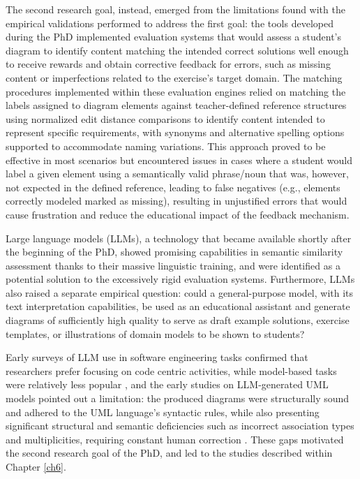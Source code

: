 The second research goal, instead, emerged from the limitations found with the empirical validations performed to address the first goal: the tools developed during the PhD implemented evaluation systems that would assess a student's diagram to identify content matching the intended correct solutions well enough to receive rewards and obtain corrective feedback for errors, such as missing content or imperfections related to the exercise's target domain. The matching procedures implemented within these evaluation engines relied on matching the labels assigned to diagram elements against teacher-defined reference structures using normalized edit distance comparisons to identify content intended to represent specific requirements, with synonyms and alternative spelling options supported to accommodate naming variations. This approach proved to be effective in most scenarios but encountered issues in cases where a student would label a given element using a semantically valid phrase/noun that was, however, not expected in the defined reference, leading to false negatives (e.g., elements correctly modeled marked as missing), resulting in unjustified errors that would cause frustration and reduce the educational impact of the feedback mechanism. 

Large language models (LLMs), a technology that became available shortly after the beginning of the PhD, showed promising capabilities in semantic similarity assessment thanks to their massive linguistic training, and were identified as a potential solution to the excessively rigid evaluation systems. Furthermore, LLMs also raised a separate empirical question: could a general-purpose model, with its text interpretation capabilities, be used as an educational assistant and generate diagrams of sufficiently high quality to serve as draft example solutions, exercise templates, or illustrations of domain models to be shown to students?

Early surveys of LLM use in software engineering tasks confirmed that researchers prefer focusing on code centric activities, while model-based tasks were relatively less popular \cite{fan2023large, hou2023large}, and the early studies on LLM-generated UML models pointed out a limitation: the produced diagrams were structurally sound and adhered to the UML language's syntactic rules, while also presenting significant structural and semantic deficiencies such as incorrect association types and multiplicities, requiring constant human correction \cite{camara2023assessment, chen2023automated}. These gaps motivated the second research goal of the PhD, and led to the studies described within Chapter \ref{ch6}.

